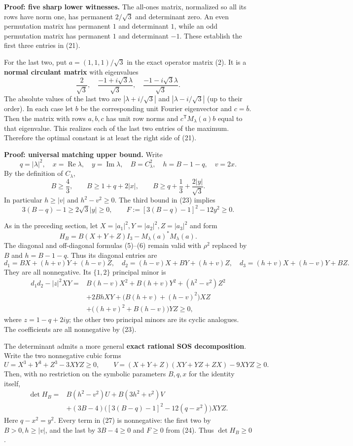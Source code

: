\documentclass[11pt]{article}
\begin{document}
\textbf{Proof: five sharp lower witnesses.} The all-ones matrix,
normalized so all its rows have norm one, has permanent \(2/\sqrt3\) and
determinant zero. An even permutation matrix has permanent \(1\) and
determinant \(1\), while an odd permutation matrix has permanent \(1\)
and determinant \(-1\). These establish the first three entries in (21).

For the last two, put \(a=(1,1,1)/\sqrt3\) in the exact operator matrix
(2). It is a \textbf{normal circulant matrix} with eigenvalues \[
\frac2{\sqrt3},\quad
\frac{-1+i\sqrt3\lambda}{\sqrt3},\quad
\frac{-1-i\sqrt3\lambda}{\sqrt3}.
\tag{22}
\] The absolute values of the last two are \(|\lambda+i/\sqrt3|\) and
\(|\lambda-i/\sqrt3|\) (up to their order). In each case let \(b\) be
the corresponding unit Fourier eigenvector and \(c=\overline b\). Then
the matrix with rows \(a,b,c\) has unit row norms and
\(c^{\mathsf T}M_\lambda(a)b\) equal to that eigenvalue. This realizes
each of the last two entries of the maximum. Therefore the optimal
constant is at least the right side of (21).

\textbf{Proof: universal matching upper bound.} Write \[
q=|\lambda|^2,\quad x=\operatorname{Re}\lambda,\quad
y=\operatorname{Im}\lambda,\quad
B=C_\lambda^2,\quad h=B-1-q,\quad v=2x.
\] By the definition of \(C_\lambda\), \[
B\ge\frac43,\qquad
B\ge1+q+2|x|,\qquad
B\ge q+\frac13+\frac{2|y|}{\sqrt3}.
\tag{23}
\] In particular \(h\ge|v|\) and \(h^2-v^2\ge0\). The third bound in
(23) implies \[
3(B-q)-1\ge2\sqrt3|y|\ge0,
\qquad
F:=[3(B-q)-1]^2-12y^2\ge0.
\tag{24}
\]

As in the preceding section, let \(X=|a_1|^2,Y=|a_2|^2,Z=|a_3|^2\) and
form \[
H_B=B(X+Y+Z)I_3-M_\lambda(a)^*M_\lambda(a).
\] The diagonal and off-diagonal formulas (5)--(6) remain valid with
\(\rho^2\) replaced by \(B\) and \(h=B-1-q\). Thus its diagonal entries
are \[
d_1=BX+(h+v)Y+(h-v)Z,\quad
d_2=(h-v)X+BY+(h+v)Z,\quad
d_3=(h+v)X+(h-v)Y+BZ.
\tag{25}
\] They are all nonnegative. Its \(\{1,2\}\) principal minor is \[
\begin{aligned}
d_1d_2-|z|^2XY={}&
B(h-v)X^2+B(h+v)Y^2+(h^2-v^2)Z^2\\
&+2BhXY+
\bigl(B(h+v)+(h-v)^2\bigr)XZ\\
&+\bigl((h+v)^2+B(h-v)\bigr)YZ\ge0,
\end{aligned}
\tag{26}
\] where \(z=1-q+2iy\); the other two principal minors are its cyclic
analogues. The coefficients are all nonnegative by (23).

The determinant admits a more general \textbf{exact rational SOS
decomposition}. Write the two nonnegative cubic forms \[
U=X^3+Y^3+Z^3-3XYZ\ge0,
\qquad
V=(X+Y+Z)(XY+YZ+ZX)-9XYZ\ge0.
\] Then, with no restriction on the symbolic parameters \(B,q,x\) for
the identity itself, \[
\boxed{
\begin{aligned}
\det H_B={}&
B(h^2-v^2)U+B(3h^2+v^2)V\\
&+(3B-4)\Big([3(B-q)-1]^2-12(q-x^2)\Big)XYZ .
\end{aligned}}
\tag{27}
\] Here \(q-x^2=y^2\). Every term in (27) is nonnegative: the first two
by \(B>0,h\ge|v|\), and the last by \(3B-4\ge0\) and \(F\ge0\) from
(24). Thus \(\det H_B\ge0\).
\end{document}
